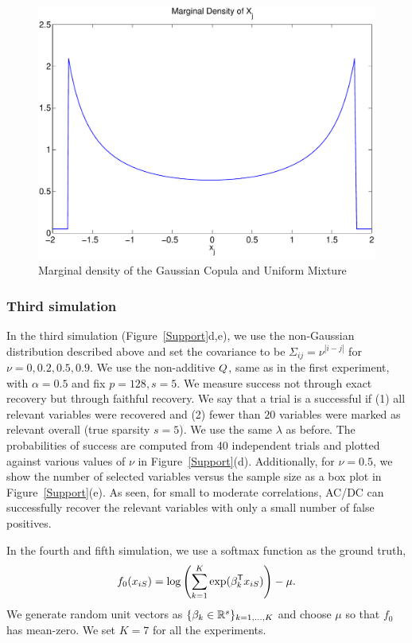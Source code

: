 \begin{figure}
\includegraphics[width=.4\textwidth]{figs/copula_marginal}
\caption{Marginal density of the Gaussian Copula and Uniform Mixture}
\label{fig:copula_marginal}
\end{figure}

\subsubsection{Third simulation}
In the \textrm{third simulation} (Figure~\ref{Support}d,e), we use the
non-Gaussian distribution described above and set the covariance
to be $\Sigma_{ij}=\nu^{|i-j|}$ for $\nu = 0, 0.2, 0.5, 0.9$. We use the
non-additive $Q$, same as in the first experiment, with $\alpha=0.5$
and fix $p=128, s=5$. We measure success not through exact recovery
but through faithful recovery. We say that a trial is a successful if
(1) all relevant variables were recovered and (2) fewer than $20$
variables were marked as relevant overall (true sparsity $s=5$). We
use the same $\lambda$ as before. The probabilities of success are
computed from 40 independent trials and plotted against various values
of $\nu$ in Figure~\ref{Support}(d). Additionally, for $\nu = 0.5$, we
show the number of selected variables versus the sample size as a
box plot in Figure~\ref{Support}(e). As seen, for small to
moderate correlations, AC/DC can successfully recover the relevant
variables with only a small number of false positives.

In the fourth and fifth simulation, we use a softmax function as the ground truth,
\begin{align}
f_0(x_{iS}) = \log \left( \sum_{k=1}^K \exp( \beta_k^{\mathsf{T}} x_{iS} ) \right) - \mu.
\end{align}
We generate random unit vectors as $\{\beta_k \in {\mathbb R}^s\}_{k=1,\ldots,K}$ and choose $\mu$ so that $f_0$ has mean-zero. We set $K = 7$ for all the experiments. 

